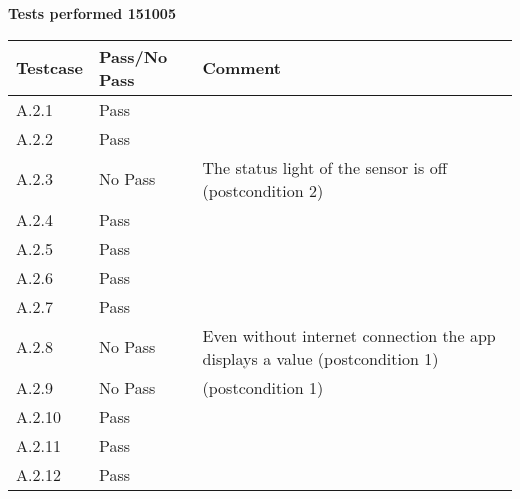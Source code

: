 \renewcommand{\testdate}{151005}
\textbf{Tests performed \testdate}
	\begin{center}
  		\begin{tabular}{| p{3cm} | p{5cm} | p{5cm} |}
    		\hline
	    	\textbf{Testcase}			& \textbf{Pass/No Pass} 	& \textbf{Comment} \\ \hline
    		A.2.1		 						& Pass 								&  				\\ \hline
    		A.2.2		 						& Pass  							& 				 \\	\hline
    		A.2.3		 						& No Pass 							& The status light of the sensor is off (postcondition 2)				 \\	\hline
    		A.2.4		 						& Pass  							& 				 \\	\hline
    		A.2.5		 						& Pass 								& 			 \\	\hline
    		A.2.6		 						& Pass 								& 				 \\	\hline
    		A.2.7		 						& Pass 								& 				 \\	\hline
    		A.2.8		 						& No Pass 							& Even without internet connection the app displays a value (postcondition 1)			 \\	\hline
    		A.2.9		 						& No Pass 							& (postcondition 1)				 \\	\hline
    		A.2.10	 							& Pass 								& 				 \\	\hline
    		A.2.11	 							& Pass 								& 				 \\	\hline
    		A.2.12	 							& Pass 								& 				 \\	\hline
 		 \end{tabular}
	\end{center}